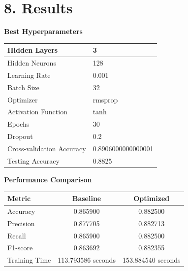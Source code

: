 \documentclass[11pt]{article}
\begin{document}
\vspace{50mm}
\section*{8. Results}

\textbf{Best Hyperparameters}\\

\begin{tabular}{|p{6cm}|p{6cm}|}
\hline
Hidden Layers & 3\\\hline
Hidden Neurons & 128\\\hline
Learning Rate & 0.001\\\hline
Batch Size & 32\\\hline
Optimizer & rmsprop\\\hline
Activation Function & tanh\\\hline
Epochs & 30\\\hline
Dropout & 0.2\\\hline
Cross-validation Accuracy &  0.8906000000000001\\\hline
Testing Accuracy & 0.8825\\\hline
\end{tabular}

\vspace{3mm}

\textbf{Performance Comparison}\\

\begin{tabular}{|p{4cm}|c|c|}
\hline
Metric & Baseline & Optimized\\
\hline
Accuracy& 0.865900& 0.882500\\
Precision& 0.877705& 0.882713\\
Recall& 0.865900& 0.882500\\
F1-score& 0.863692& 0.882355\\
Training Time& 113.793586 seconds & 153.884540 seconds\\
\hline
\end{tabular}
\end{document}
